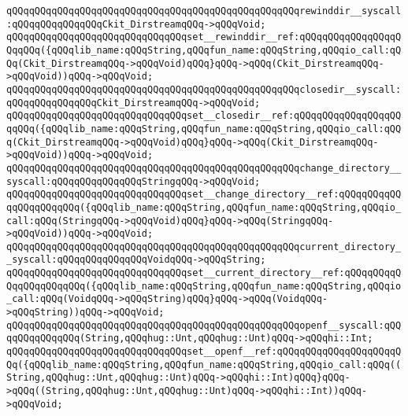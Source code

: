 \newline
\verb|qQQqqQQqqQQqqQQqqQQqqQQqqQQqqQQqqQQqqQQqqQQqqQQqqQQqrewinddir__syscall:qQQqqQQqqQQqqQQqCkit_DirstreamqQQq->qQQqVoid;|\newline
\verb|qQQqqQQqqQQqqQQqqQQqqQQqqQQqqQQqset__rewinddir__ref:qQQqqQQqqQQqqQQqqQQqqQQq({qQQqlib_name:qQQqString,qQQqfun_name:qQQqString,qQQqio_call:qQQq(Ckit_DirstreamqQQq->qQQqVoid)qQQq}qQQq->qQQq(Ckit_DirstreamqQQq->qQQqVoid))qQQq->qQQqVoid;|\newline
\newline
\verb|qQQqqQQqqQQqqQQqqQQqqQQqqQQqqQQqqQQqqQQqqQQqqQQqqQQqclosedir__syscall:qQQqqQQqqQQqqQQqCkit_DirstreamqQQq->qQQqVoid;|\newline
\verb|qQQqqQQqqQQqqQQqqQQqqQQqqQQqqQQqset__closedir__ref:qQQqqQQqqQQqqQQqqQQqqQQq({qQQqlib_name:qQQqString,qQQqfun_name:qQQqString,qQQqio_call:qQQq(Ckit_DirstreamqQQq->qQQqVoid)qQQq}qQQq->qQQq(Ckit_DirstreamqQQq->qQQqVoid))qQQq->qQQqVoid;|\newline
\newline
\verb|qQQqqQQqqQQqqQQqqQQqqQQqqQQqqQQqqQQqqQQqqQQqqQQqqQQqchange_directory__syscall:qQQqqQQqqQQqqQQqStringqQQq->qQQqVoid;|\newline
\verb|qQQqqQQqqQQqqQQqqQQqqQQqqQQqqQQqset__change_directory__ref:qQQqqQQqqQQqqQQqqQQqqQQq({qQQqlib_name:qQQqString,qQQqfun_name:qQQqString,qQQqio_call:qQQq(StringqQQq->qQQqVoid)qQQq}qQQq->qQQq(StringqQQq->qQQqVoid))qQQq->qQQqVoid;|\newline
\newline
\verb|qQQqqQQqqQQqqQQqqQQqqQQqqQQqqQQqqQQqqQQqqQQqqQQqqQQqcurrent_directory__syscall:qQQqqQQqqQQqqQQqVoidqQQq->qQQqString;|\newline
\verb|qQQqqQQqqQQqqQQqqQQqqQQqqQQqqQQqset__current_directory__ref:qQQqqQQqqQQqqQQqqQQqqQQq({qQQqlib_name:qQQqString,qQQqfun_name:qQQqString,qQQqio_call:qQQq(VoidqQQq->qQQqString)qQQq}qQQq->qQQq(VoidqQQq->qQQqString))qQQq->qQQqVoid;|\newline
\newline
\verb|qQQqqQQqqQQqqQQqqQQqqQQqqQQqqQQqqQQqqQQqqQQqqQQqqQQqopenf__syscall:qQQqqQQqqQQqqQQq(String,qQQqhug::Unt,qQQqhug::Unt)qQQq->qQQqhi::Int;|\newline
\verb|qQQqqQQqqQQqqQQqqQQqqQQqqQQqqQQqset__openf__ref:qQQqqQQqqQQqqQQqqQQqqQQq({qQQqlib_name:qQQqString,qQQqfun_name:qQQqString,qQQqio_call:qQQq((String,qQQqhug::Unt,qQQqhug::Unt)qQQq->qQQqhi::Int)qQQq}qQQq->qQQq((String,qQQqhug::Unt,qQQqhug::Unt)qQQq->qQQqhi::Int))qQQq->qQQqVoid;|\newline
\newline
